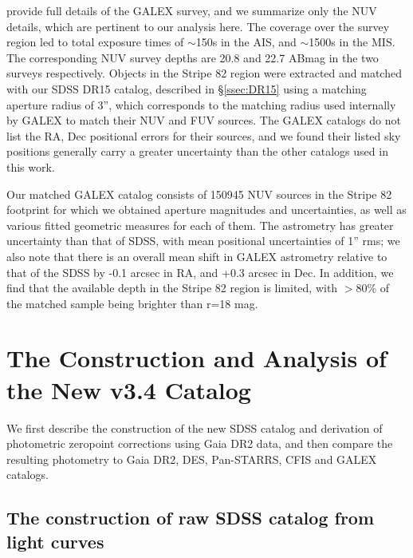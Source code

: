 \documentclass[fleqn,usenatbib]{mnras}
\begin{document}
\citet{2017ApJS..230...24B} provide full details of the GALEX survey, and we summarize only the NUV details, which are pertinent to our analysis here. The coverage over the survey region led to total exposure times of $\sim$150s in the AIS, and $\sim$1500s in the MIS. The corresponding NUV survey depths are 20.8 and 22.7 ABmag in the two surveys respectively. Objects in the Stripe 82 region were extracted and matched with our SDSS DR15 catalog, described in \S \ref{ssec:DR15} using a matching aperture radius of 3'', which corresponds to the matching radius used internally by GALEX to match their NUV and FUV sources. The GALEX catalogs do not list the RA, Dec positional errors for their sources, and we found their listed sky positions generally carry a greater uncertainty than the other catalogs used in this work.

Our matched GALEX catalog consists of 150945 NUV sources in the Stripe 82 footprint for which we obtained aperture magnitudes and uncertainties, as well as various fitted geometric measures for each of them. The astrometry has greater uncertainty than that of SDSS, with mean positional uncertainties of 1'' rms; we also note that there is an overall mean shift in GALEX astrometry relative to that of the SDSS by -0.1 arcsec in RA, and +0.3 arcsec in Dec. In addition, we find that the available depth in the Stripe 82 region is limited, with $>$80\% of the matched sample being brighter than r=18 mag. 
  
 
\section{The Construction and Analysis of the New v3.4 Catalog \label{sec:v34}}

We first describe the construction of the new SDSS catalog and derivation of photometric
zeropoint corrections using Gaia DR2 data, and then compare the resulting photometry to 
Gaia DR2, DES, Pan-STARRS, CFIS and GALEX catalogs. 


\subsection{The construction of raw SDSS catalog from light curves \label{sec:averaging}} 
\end{document}

